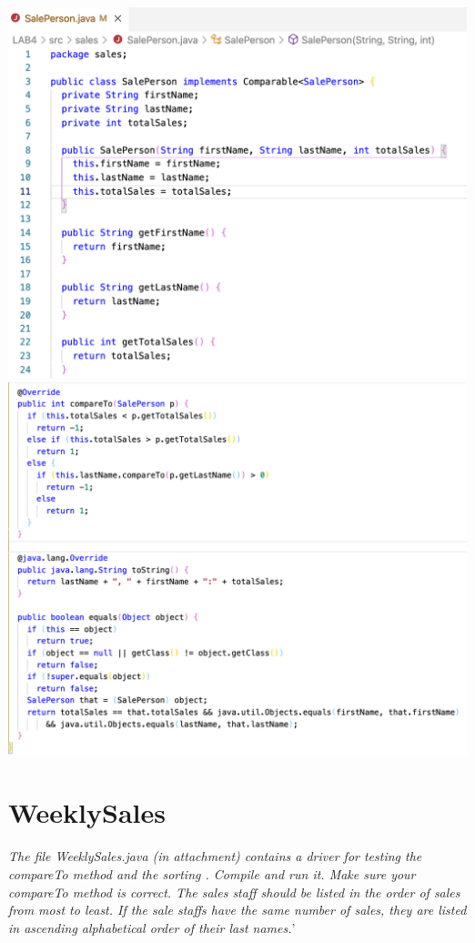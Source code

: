 \documentclass[hidelinks,12pt]{article}
\begin{document}
\includegraphics[scale=0.3]{SalesPerson1.png}
\quad
\includegraphics[scale=0.25]{SalesPerson2.png}
\newpage

\section{WeeklySales}
\textit{The file WeeklySales.java (in attachment) contains a driver for testing the compareTo method and the
sorting . Compile and run it. Make sure your compareTo method is correct. The sales staff should be
listed in the order of sales from most to least. If the sale staffs have the same number of sales, they
are listed in ascending alphabetical order of their last names.}'
\end{document}
